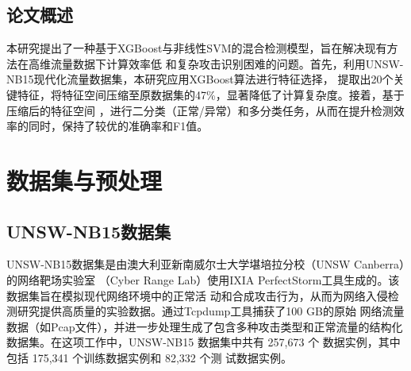 \documentclass{article}
\begin{document}
\subsection{论文概述}
本研究提出了一种基于XGBoost与非线性SVM的混合检测模型，旨在解决现有方法在高维流量数据下计算效率低
和复杂攻击识别困难的问题。首先，利用UNSW-NB15现代化流量数据集，本研究应用XGBoost算法进行特征选择，
提取出20个关键特征，将特征空间压缩至原数据集的47\%，显著降低了计算复杂度。接着，基于压缩后的特征空间
，进行二分类（正常/异常）和多分类任务，从而在提升检测效率的同时，保持了较优的准确率和F1值。




\section{数据集与预处理}
\subsection{UNSW-NB15数据集}
UNSW-NB15数据集是由澳大利亚新南威尔士大学堪培拉分校（UNSW Canberra）的网络靶场实验室
（Cyber Range Lab）使用IXIA PerfectStorm工具生成的\cite{ref9}。该数据集旨在模拟现代网络环境中的正常活
动和合成攻击行为，从而为网络入侵检测研究提供高质量的实验数据。通过Tcpdump工具捕获了100 GB的原始
网络流量数据（如Pcap文件），并进一步处理生成了包含多种攻击类型和正常流量的结构化数据集。在这项工作中，UNSW-NB15 
数据集中共有 257,673 个
数据实例，其中包括 175,341 个训练数据实例和 82,332 个测
试数据实例。
\end{document}
